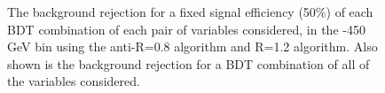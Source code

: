 \begin{figure}
\begin{center}
\caption{
The background rejection
for a fixed signal efficiency (50\%) of each BDT combination of
each pair of variables considered, in the -450 GeV bin using the anti-\kT R=0.8
algorithm and R=1.2 algorithm. Also shown is the background rejection
for a BDT combination of all of the variables considered.
}
\label{fig:pt300_comb2D}
\end{center}
\end{figure}


